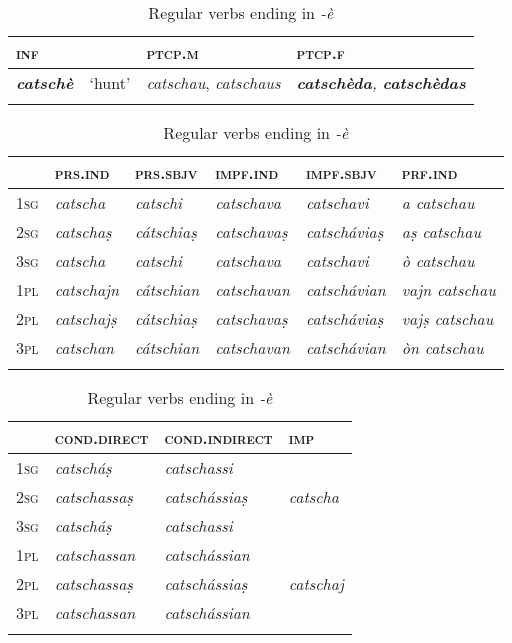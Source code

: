 \begin{table}
\caption{Regular verbs ending in \textit{-è}}
\label{conjè}
 \begin{tabularx}{\textwidth}{XXXl}
 
  \lsptoprule
  \textsc{inf}  && \textsc{ptcp.m}  & \textsc{ptcp.f}\\
  \midrule
  \textit{\textbf{catschè}} & `hunt' & \textit{catschau}, \textit{catschaus} & \textit{\textbf{catschèda}, \textit{\textbf{catschèdas}}}\\
  \lspbottomrule  
  \end{tabularx}
  
  \medskip
  
 \begin{tabularx}{\textwidth}{Xlllll}
  \lsptoprule
& \textsc{prs.ind} & \textsc{prs.sbjv} & \textsc{impf.ind} & \textsc{impf.sbjv} &\textsc{prf.ind}\\
 \midrule
\textsc{1sg} &\textit{catscha} & \textit{catschi}&\textit{catschava} &\textit{catschavi} & \textit{a catschau}\\
\textsc{2sg} &\textit{catschaṣ} & \textit{cátschiaṣ}&\textit{catschavaṣ} &\textit{catscháviaṣ} &\textit{aṣ catschau}\\
\textsc{3sg}  & \textit{catscha} & \textit{catschi} & \textit{catschava} & \textit{catschavi} & \textit{ò catschau}\\
\textsc{1pl} & \textit{catschajn} & \textit{cátschian} & \textit{catschavan} &\textit{catschávian} & \textit {vajn catschau}\\
\textsc{2pl} &\textit{catschajṣ} &\textit{cátschiaṣ} & \textit{catschavaṣ} &\textit{catscháviaṣ} &\textit{vajṣ catschau}\\
\textsc{3pl} & \textit{catschan} &\textit{cátschian} &\textit{catschavan} &\textit{catschávian} &\textit{òn catschau}\\

  \lspbottomrule
\end{tabularx}

\medskip

\begin{tabularx} {\textwidth}{XXXl}
 \lsptoprule
  &\textsc{cond.direct} &  \textsc{cond.indirect}  &\textsc{imp}\\
\midrule
\textsc{1sg} & \textit{catscháṣ}&\textit{catschassi} &\\
\textsc{2sg}  & \textit{catschassaṣ}&\textit{catschássiaṣ} &\textit{catscha}\\
\textsc{3sg} & \textit{catscháṣ} &\textit{catschassi} &\\
\textsc{1pl} & \textit{catschassan} & \textit{catschássian} &\\
\textsc{2pl} & \textit{catschassaṣ} & \textit{catschássiaṣ} &\textit{catschaj}\\
\textsc{3pl} & \textit{catschassan} & \textit{catschássian}&\\

  \lspbottomrule
 \end{tabularx} 
\end{table}

